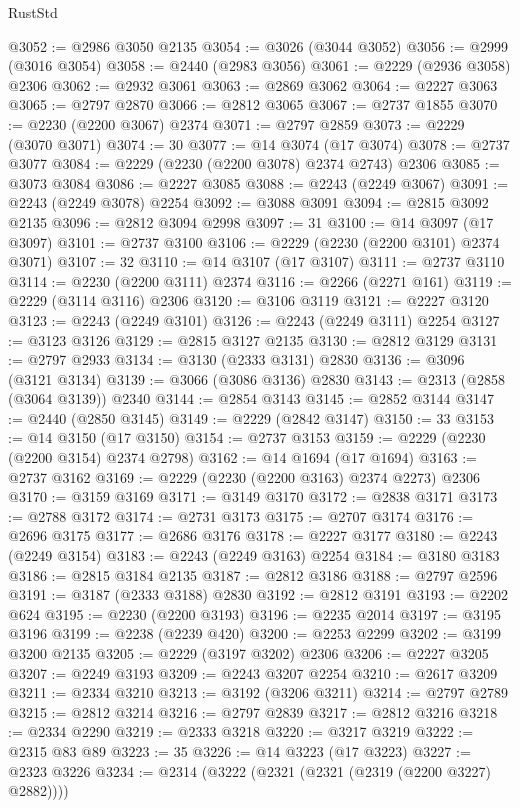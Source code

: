 \begin{lexlean}{RustStd}
\begin{coremodule}
@3052 := @2986 @3050 @2135
@3054 := @3026 (@3044 @3052)
@3056 := @2999 (@3016 @3054)
@3058 := @2440 (@2983 @3056)
@3061 := @2229 (@2936 @3058) @2306
@3062 := @2932 @3061
@3063 := @2869 @3062
@3064 := @2227 @3063
@3065 := @2797 @2870
@3066 := @2812 @3065
@3067 := @2737 @1855
@3070 := @2230 (@2200 @3067) @2374
@3071 := @2797 @2859
@3073 := @2229 (@3070 @3071)
@3074 := 30
@3077 := @14 @3074 (@17 @3074)
@3078 := @2737 @3077
@3084 := @2229 (@2230 (@2200 @3078) @2374 @2743) @2306
@3085 := @3073 @3084
@3086 := @2227 @3085
@3088 := @2243 (@2249 @3067)
@3091 := @2243 (@2249 @3078) @2254
@3092 := @3088 @3091
@3094 := @2815 @3092 @2135
@3096 := @2812 @3094 @2998
@3097 := 31
@3100 := @14 @3097 (@17 @3097)
@3101 := @2737 @3100
@3106 := @2229 (@2230 (@2200 @3101) @2374 @3071)
@3107 := 32
@3110 := @14 @3107 (@17 @3107)
@3111 := @2737 @3110
@3114 := @2230 (@2200 @3111) @2374
@3116 := @2266 (@2271 @161)
@3119 := @2229 (@3114 @3116) @2306
@3120 := @3106 @3119
@3121 := @2227 @3120
@3123 := @2243 (@2249 @3101)
@3126 := @2243 (@2249 @3111) @2254
@3127 := @3123 @3126
@3129 := @2815 @3127 @2135
@3130 := @2812 @3129
@3131 := @2797 @2933
@3134 := @3130 (@2333 @3131) @2830
@3136 := @3096 (@3121 @3134)
@3139 := @3066 (@3086 @3136) @2830
@3143 := @2313 (@2858 (@3064 @3139)) @2340
@3144 := @2854 @3143
@3145 := @2852 @3144
@3147 := @2440 (@2850 @3145)
@3149 := @2229 (@2842 @3147)
@3150 := 33
@3153 := @14 @3150 (@17 @3150)
@3154 := @2737 @3153
@3159 := @2229 (@2230 (@2200 @3154) @2374 @2798)
@3162 := @14 @1694 (@17 @1694)
@3163 := @2737 @3162
@3169 := @2229 (@2230 (@2200 @3163) @2374 @2273) @2306
@3170 := @3159 @3169
@3171 := @3149 @3170
@3172 := @2838 @3171
@3173 := @2788 @3172
@3174 := @2731 @3173
@3175 := @2707 @3174
@3176 := @2696 @3175
@3177 := @2686 @3176
@3178 := @2227 @3177
@3180 := @2243 (@2249 @3154)
@3183 := @2243 (@2249 @3163) @2254
@3184 := @3180 @3183
@3186 := @2815 @3184 @2135
@3187 := @2812 @3186
@3188 := @2797 @2596
@3191 := @3187 (@2333 @3188) @2830
@3192 := @2812 @3191
@3193 := @2202 @624
@3195 := @2230 (@2200 @3193)
@3196 := @2235 @2014
@3197 := @3195 @3196
@3199 := @2238 (@2239 @420)
@3200 := @2253 @2299
@3202 := @3199 @3200 @2135
@3205 := @2229 (@3197 @3202) @2306
@3206 := @2227 @3205
@3207 := @2249 @3193
@3209 := @2243 @3207 @2254
@3210 := @2617 @3209
@3211 := @2334 @3210
@3213 := @3192 (@3206 @3211)
@3214 := @2797 @2789
@3215 := @2812 @3214
@3216 := @2797 @2839
@3217 := @2812 @3216
@3218 := @2334 @2290
@3219 := @2333 @3218
@3220 := @3217 @3219
@3222 := @2315 @83 @89
@3223 := 35
@3226 := @14 @3223 (@17 @3223)
@3227 := @2323 @3226
@3234 := @2314 (@3222 (@2321 (@2321 (@2319 (@2200 @3227) @2882))))

\end{coremodule}
\end{lexlean}
